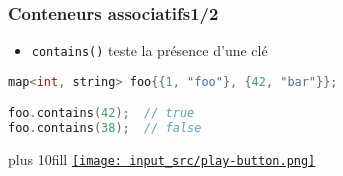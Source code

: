\documentclass[C++.tex]{subfiles}
\begin{document}
\begin{frame}[fragile]
	\frametitle{Conteneurs associatifs\titlehfill{}1/2}
	\begin{itemize}
		\item \lstinline|contains()| teste la présence d'une clé

	\end{itemize}

	\begin{lstlisting}[language=C++]
map<int, string> foo{{1, "foo"}, {42, "bar"}};

foo.contains(42);  // true
foo.contains(38);  // false\end{lstlisting}

	\vskip 10mm plus 10fill
	\hfill
	\href{https://godbolt.org/#g:!((g:!((g:!((h:codeEditor,i:(filename:'1',fontScale:14,fontUsePx:'0',j:1,lang:c%2B%2B,selection:(endColumn:1,endLineNumber:13,positionColumn:1,positionLineNumber:13,selectionStartColumn:1,selectionStartLineNumber:13,startColumn:1,startLineNumber:13),source:'%23include+%3Cmap%3E%0A%23include+%3Cstring%3E%0A%23include+%3Ciostream%3E%0A%0Aint+main()%0A%7B%0A++std::map%3Cint,+std::string%3E+foo%7B%7B1,+%22foo%22%7D,+%7B42,+%22bar%22%7D%7D%3B%0A%0A++std::cout+%3C%3C+std::boolalpha%3B%0A++std::cout+%3C%3C+foo.contains(42)+%3C%3C+%22%5Cn%22%3B%0A++std::cout+%3C%3C+foo.contains(38)+%3C%3C+%22%5Cn%22%3B%0A%7D%0A'),l:'5',n:'0',o:'C%2B%2B+source+%231',t:'0')),k:50,l:'4',n:'0',o:'',s:0,t:'0'),(g:!((h:executor,i:(argsPanelShown:'1',compilationPanelShown:'0',compiler:g112,compilerOutShown:'0',execArgs:'',execStdin:'',fontScale:14,fontUsePx:'0',j:1,lang:c%2B%2B,libs:!((name:boost,ver:'175')),options:'-std%3Dc%2B%2B20',source:1,stdinPanelShown:'1',tree:'1',wrap:'0'),l:'5',n:'0',o:'Executor+x86-64+gcc+11.2+(C%2B%2B,+Editor+%231)',t:'0')),header:(),k:50,l:'4',n:'0',o:'',s:0,t:'0')),l:'2',n:'0',o:'',t:'0')),version:4}{\texttt{[image: input\_src/play-button.png]}}
\end{frame}
\end{document}
